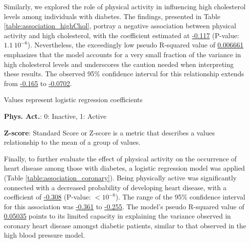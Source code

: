\documentclass[11pt]{article}
\begin{document}
Similarly, we explored the role of physical activity in influencing high cholesterol levels among individuals with diabetes. The findings, presented in Table \ref{table:association_highChol}, portray a negative association between physical activity and high cholesterol, with the coefficient estimated at \hyperlink{C1a}{-0.117} (P-value: \hyperlink{C1d}{$1.1\ 10^{-6}$}). Nevertheless, the exceedingly low pseudo R-squared value of \hyperlink{R2a}{0.006661} emphasizes that the model accounts for a very small fraction of the variance in high cholesterol levels and underscores the caution needed when interpreting these results. The observed 95\% confidence interval for this relationship extends from \hyperlink{C1e}{-0.165} to \hyperlink{C1f}{-0.0702}.

\begin{table}[h]
\caption{\protect\hyperlink{file-table-2-pkl}{Association between physical activity and high cholesterol among diabetics}}
\label{table:association_highChol}
\begin{threeparttable}
\renewcommand{\TPTminimum}{\linewidth}
\begin{tablenotes}
\footnotesize
\item Values represent logistic regression coefficients
\item \textbf{Phys. Act.}: 0: Inactive, 1: Active
\item \textbf{Z-score}: Standard Score or Z-score is a metric that describes a values relationship to the mean of a group of values.
\end{tablenotes}
\end{threeparttable}
\end{table}


Finally, to further evaluate the effect of physical activity on the occurrence of heart disease among those with diabetes, a logistic regression model was applied (Table \ref{table:association_coronary}). Being physically active was significantly connected with a decreased probability of developing heart disease, with a coefficient of \hyperlink{D1a}{-0.308} (P-value: $<$\hyperlink{D1d}{$10^{-6}$}). The range of the 95\% confidence interval for this association was \hyperlink{D1e}{-0.361} to \hyperlink{D1f}{-0.255}. The model's pseudo R-squared value of \hyperlink{R3a}{0.05035} points to its limited capacity in explaining the variance observed in coronary heart disease amongst diabetic patients, similar to that observed in the high blood pressure model.
\end{document}
